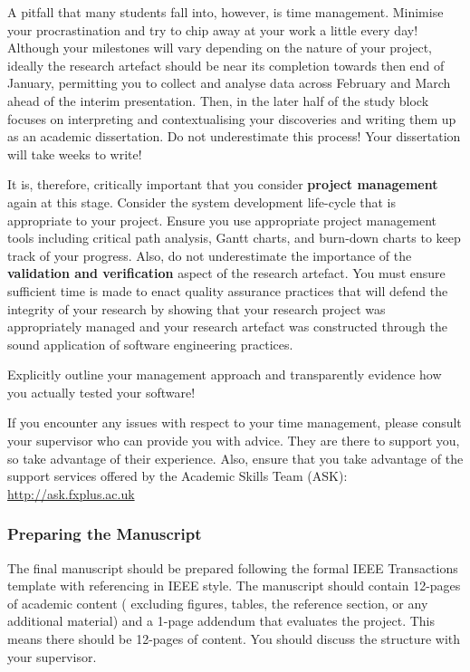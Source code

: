 \documentclass{../fal_assignment}
\begin{document}
A pitfall that many students fall into, however, is time management. Minimise your procrastination and try to chip away at your work a little every day! Although your milestones will vary depending on the nature of your project, ideally the research artefact should be near its completion towards then end of January, permitting you to collect and analyse data across February and March ahead of the interim presentation. Then, in the later half of the study block focuses on interpreting and contextualising your discoveries and writing them up as an academic dissertation. Do not underestimate this process! Your dissertation will take weeks to write!

It is, therefore, critically important that you consider \textbf{project management} again at this stage. Consider the system development life-cycle that is appropriate to your project. Ensure you use appropriate project management tools including critical path analysis, Gantt charts, and burn-down charts to keep track of your progress. Also, do not underestimate the importance of the \textbf{validation and verification} aspect of the research artefact. You must ensure sufficient time is made to enact quality assurance practices that will defend the integrity of your research by showing that your research project was appropriately managed and your research artefact was constructed through the sound application of software engineering practices. 

Explicitly outline your management approach and transparently evidence how you actually tested your software!

If you encounter any issues with respect to your time management, please consult your supervisor who can provide you with advice. They are there to support you, so take advantage of their experience. Also, ensure that you take advantage of the support services offered by the Academic Skills Team (ASK): \url{http://ask.fxplus.ac.uk}

\subsubsection*{Preparing the Manuscript}

The final manuscript should be prepared following the formal IEEE Transactions template with referencing in IEEE style. The manuscript should contain 12-pages of academic content ( excluding figures, tables, the reference section, or any additional material) and a 1-page addendum that evaluates the project. This means there should be 12-pages of content. You should discuss the structure with your supervisor.
\end{document}
